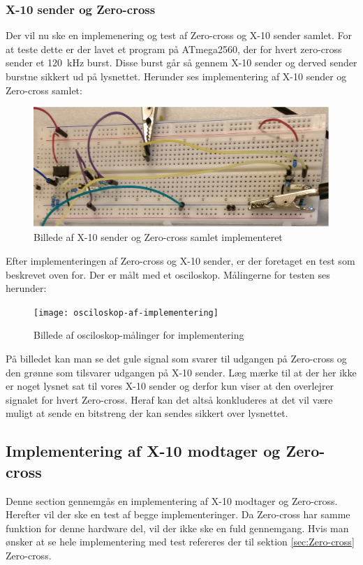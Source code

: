 \documentclass[11pt]{article}
\begin{document}
\subsubsection{X-10 sender og Zero-cross}
Der vil nu ske en implemenering og test af Zero-cross og X-10 sender samlet. For at teste dette er der lavet et program på ATmega2560, der for hvert zero-cross sender et \SI{120}{\kilo\hertz} burst. Disse burst går så gennem X-10 sender og derved sender burstne sikkert ud på lysnettet. Herunder ses implementering af X-10 sender og Zero-cross samlet:
\begin{figure}[H]
	\centering
	\includegraphics[scale = 0.2]{implementering-zerocross-sender}
	\caption{Billede af X-10 sender og Zero-cross samlet implementeret}
	\label{fig:SamletImpZXSender}
\end{figure}
Efter implementeringen af Zero-cross og X-10 sender, er der foretaget en test som beskrevet oven for. Der er målt med et osciloskop. Målingerne for testen ses herunder:
\begin{figure}[H]
	\centering
	\texttt{[image: osciloskop-af-implementering]}
	\caption{Billede af osciloskop-målinger for implementering}
	\label{fig:OscImplementering}
\end{figure}
På billedet kan man se det gule signal som svarer til udgangen på Zero-cross og den grønne som tilsvarer udgangen på X-10 sender. Læg mærke til at der her ikke er noget lysnet sat til vores X-10 sender og derfor kun viser at den overlejrer signalet for hvert Zero-cross. Heraf kan det altså konkluderes at det vil være muligt at sende en bitstreng der kan sendes sikkert over lysnettet.
\subsection{Implementering af X-10 modtager og Zero-cross}
Denne section gennemgås en implementering af X-10 modtager og Zero-cross. Herefter vil der ske en test af begge implementeringer. Da Zero-cross har samme funktion for denne hardware del, vil der ikke ske en fuld gennemgang. Hvis man ønsker at se hele implementering med test refereres der til sektion \ref{sec:Zero-cross} Zero-cross.
\end{document}
